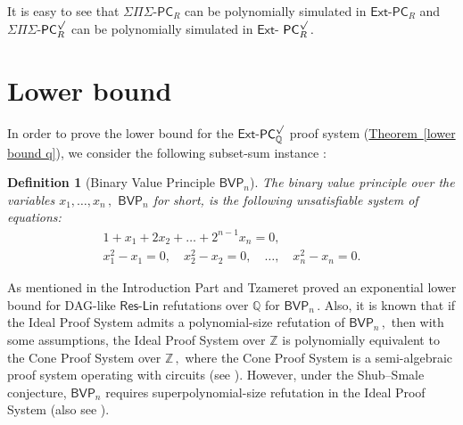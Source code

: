 \documentclass[11pt]{article}
\newcommand{\expref}[2]{\texorpdfstring{\hyperref[#2]{#1~\ref{#2}}}{#1~\ref{#2}}}
\newtheorem{definition}[theorem]{Definition}
\newcommand{\Q}{{\mathbb Q}}
\newcommand{\Z}{{\mathbb Z}}
\begin{document}
It is easy to see that $\Sigma \Pi \Sigma$-$\mathsf{PC}_R$ can be polynomially simulated in $\mathsf{Ext}$-$\mathsf{PC}_{R}$ and $\Sigma \Pi \Sigma$-$\mathsf{PC}_R^{\surd}$ can be polynomially simulated in $\mathsf{Ext}$-%
$\mathsf{PC}_{R}^{\surd}\,.$ %




\section{Lower bound}\label{section-3}

In order to prove the lower bound for the $\mathsf{Ext}$-$\mathsf{PC}^{\surd}_{\Q}$ proof system (\expref{Theorem}{lower bound q}), we consider the following subset-sum instance \cite{AGHT19_new, PT18_new}:


\begin{definition}[Binary Value Principle $\mathsf{BVP}_n$]
The \emph{binary value principle} over the variables %
$x_1,\dots, x_n\,,$ %
 $\mathsf{BVP}_n$  for short, is the following unsatisfiable system of equations:
\begin{align*}
1 + x_1 + 2 x_2 + \ldots + 2^{n - 1} x_n = 0, \\
x_1^2 - x_1 = 0, \quad x_2^2 - x_2 = 0, \quad \ldots, \quad x_n^2 - x_n = 0.
\end{align*}
\end{definition}

As %
mentioned in the %
Introduction  %
Part and Tzameret \cite{PT18_new} proved an exponential lower bound for DAG-like $\mathsf{Res}$-$\mathsf{Lin}$ refutations over $\Q$ for
%
%
$\mathsf{BVP}_n\,.$ %
 Also, it is known that if the Ideal Proof System admits
a %
%
polynomial-size refutation  %
of %
$\mathsf{BVP}_n\,,$ %
 then with some assumptions, the Ideal Proof System over $\Z$ is polynomially equivalent to the Cone Proof System over %
$\Z\,,$ %
 where the Cone Proof System is a semi-algebraic proof system operating with circuits (see \cite{AGHT19_new}). However, under the
%
Shub--Smale  %
conjecture, $\mathsf{BVP}_n$ requires %
superpolynomial-size  %
refutation in the Ideal Proof System (also see \cite{AGHT19_new}). 
\end{document}
